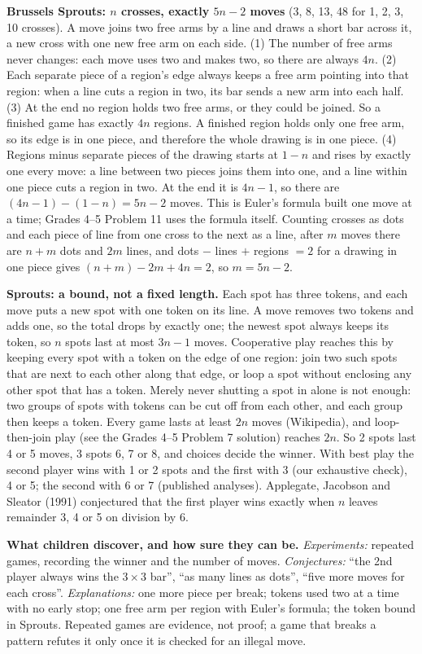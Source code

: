 \documentclass[11pt]{article}
\newcommand{\by}{\,$\times$\,}
\begin{document}
\textbf{Brussels Sprouts: $n$ crosses, exactly $5n-2$ moves} (3, 8, 13, 48 for 1, 2, 3, 10 crosses). A move joins two free arms by a line and draws a short bar across it, a new cross with one new free arm on each side. (1) The number of free arms never changes: each move uses two and makes two, so there are always $4n$. (2) Each separate piece of a region's edge always keeps a free arm pointing into that region: when a line cuts a region in two, its bar sends a new arm into each half. (3) At the end no region holds two free arms, or they could be joined. So a finished game has exactly $4n$ regions. A finished region holds only one free arm, so its edge is in one piece, and therefore the whole drawing is in one piece. (4) Regions minus separate pieces of the drawing starts at $1-n$ and rises by exactly one every move: a line between two pieces joins them into one, and a line within one piece cuts a region in two. At the end it is $4n-1$, so there are $(4n-1)-(1-n)=5n-2$ moves. This is Euler's formula built one move at a time; Grades 4--5 Problem 11 uses the formula itself. Counting crosses as dots and each piece of line from one cross to the next as a line, after $m$ moves there are $n+m$ dots and $2m$ lines, and dots $-$ lines $+$ regions $=2$ for a drawing in one piece gives $(n+m)-2m+4n=2$, so $m=5n-2$.

\textbf{Sprouts: a bound, not a fixed length.} Each spot has three tokens, and each move puts a new spot with one token on its line. A move removes two tokens and adds one, so the total drops by exactly one; the newest spot always keeps its token, so $n$ spots last at most $3n-1$ moves. Cooperative play reaches this by keeping every spot with a token on the edge of one region: join two such spots that are next to each other along that edge, or loop a spot without enclosing any other spot that has a token. Merely never shutting a spot in alone is not enough: two groups of spots with tokens can be cut off from each other, and each group then keeps a token. Every game lasts at least $2n$ moves (Wikipedia), and loop-then-join play (see the Grades 4--5 Problem 7 solution) reaches $2n$. So 2 spots last 4 or 5 moves, 3 spots 6, 7 or 8, and choices decide the winner. With best play the second player wins with 1 or 2 spots and the first with 3 (our exhaustive check), 4 or 5; the second with 6 or 7 (published analyses). Applegate, Jacobson and Sleator (1991) conjectured that the first player wins exactly when $n$ leaves remainder 3, 4 or 5 on division by 6.

\textbf{What children discover, and how sure they can be.} \emph{Experiments:} repeated games, recording the winner and the number of moves. \emph{Conjectures:} ``the 2nd player always wins the 3\by3 bar'', ``as many lines as dots'', ``five more moves for each cross''. \emph{Explanations:} one more piece per break; tokens used two at a time with no early stop; one free arm per region with Euler's formula; the token bound in Sprouts. Repeated games are evidence, not proof; a game that breaks a pattern refutes it only once it is checked for an illegal move.
\end{document}
